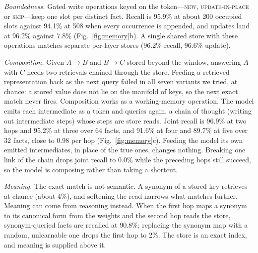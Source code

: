 \emph{Boundedness.} Gated write operations keyed on the token---\textsc{new},
\textsc{update-in-place} or \textsc{skip}---keep one slot per distinct fact. Recall is
95.9\% at about 200 occupied slots against 94.1\% at 508 when every occurrence
is appended, and updates land at 96.2\% against 7.8\%
(Fig.~\ref{fig:memory}b). A single shared store with these operations matches separate
per-layer stores (96.2\% recall, 96.6\% update).

\emph{Composition.} Given $A\!\to\!B$ and $B\!\to\!C$ stored beyond the window, answering $A$
with $C$ needs two retrievals chained through the store. Feeding a retrieved representation
back as the next query failed in all seven variants we tried, at chance: a stored value does
not lie on the manifold of keys, so the next exact match never fires. Composition works
as a working-memory operation. The model emits each intermediate as a token and
queries again, a chain of thought\cite{wei2022cot} (writing out intermediate steps) whose steps are store reads. Joint recall
is 96.9\% at two hops and 95.2\% at three over 64 facts, and 91.6\% at
four and 89.7\% at five over 32 facts, close to 0.98 per hop (Fig.~\ref{fig:memory}c). Feeding the model its own emitted intermediates, in place of the true
ones, changes nothing. Breaking one link of the chain drops joint recall to $0.0\%$ while
the preceding hops still succeed, so the model is composing rather than taking a shortcut.

\emph{Meaning.} The exact match is not semantic. A synonym of a stored key retrieves at
chance (about 4\%), and softening the read narrows what matches further. Meaning
can come from reasoning instead. When the first hop maps a synonym to its canonical form from
the weights and the second hop reads the store, synonym-queried facts are recalled at
90.8\%; replacing the synonym map with a random, unlearnable one drops the first hop
to 2\%. The store is an exact index, and meaning is supplied above it.

